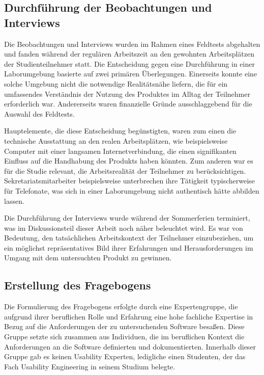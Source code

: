 \subsection{Durchführung der Beobachtungen und Interviews}

Die Beobachtungen und Interviews wurden im Rahmen eines Feldtests abgehalten und fanden während der regulären Arbeitszeit an den gewohnten Arbeitsplätzen der Studienteilnehmer statt. Die Entscheidung gegen eine Durchführung in einer Laborumgebung basierte auf zwei primären Überlegungen. Einerseits konnte eine solche Umgebung nicht die notwendige Realitätsnähe liefern, die für ein umfassendes Verständnis der Nutzung des Produktes im Alltag der Teilnehmer erforderlich war. Andererseits waren finanzielle Gründe ausschlaggebend für die Auswahl des Feldtests.

Hauptelemente, die diese Entscheidung begünstigten, waren zum einen die technische Ausstattung an den realen Arbeitsplätzen, wie beispielsweise Computer mit einer langsamen Internetverbindung, die einen signifikanten Einfluss auf die Handhabung des Produkts haben könnten. Zum anderen war es für die Studie relevant, die Arbeitsrealität der Teilnehmer zu berücksichtigen. Sekretariatsmitarbeiter beispielsweise unterbrechen ihre Tätigkeit typischerweise für Telefonate, was sich in einer Laborumgebung nicht authentisch hätte abbilden lassen.

Die Durchführung der Interviews wurde während der Sommerferien terminiert, was im Diskussionsteil dieser Arbeit noch näher beleuchtet wird. Es war von Bedeutung, den tatsächlichen Arbeitskontext der Teilnehmer einzubeziehen, um ein möglichst repräsentatives Bild ihrer Erfahrungen und Herausforderungen im Umgang mit dem untersuchten Produkt zu gewinnen.

\subsection{Erstellung des Fragebogens}

Die Formulierung des Fragebogens erfolgte durch eine Expertengruppe, die aufgrund ihrer beruflichen Rolle und Erfahrung eine hohe fachliche Expertise in Bezug auf die Anforderungen der zu untersuchenden Software besaßen. Diese Gruppe setzte sich zusammen aus Individuen, die im beruflichen Kontext die Anforderungen an die Software definierten und dokumentierten. Innerhalb dieser Gruppe gab es keinen Usability Experten, ledigliche einen Studenten, der das Fach \glqq Usability Engineering\grqq{} in seinem Studium belegte.

